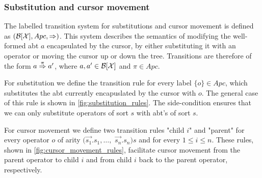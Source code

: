 \documentclass[sigplan,anonymous,review]{acmart}
\begin{document}
\subsubsection{Substitution and cursor movement}
The labelled transition system for substitutions and cursor movement is defined as $(\mathcal{B}[\mathcal{X} ], Apc, \Rightarrow)$. This system describes the semantics of modifying the well-formed abt $a$ encapsulated by the cursor, by either substituting it with an operator or moving the cursor up or down the tree. Transitions are therefore of the form $a \stackrel{\pi}{\Rightarrow} a'$, where $a, a' \in \mathcal{B}[\mathcal{X} ]$ and $\pi \in Apc$.

For substitution we define the transition rule for every label $\{o\} \in Apc$, which substitutes the abt currently encapuslated by the cursor with $o$. The general case of this rule is shown in \cref{fig:substitution_rules}. The side-condition ensures that we can only substitute operators of sort $s$ with abt's of sort $s$.

For cursor movement we define two transition rules "child  $i$" and "parent" for every operator $o$ of arity $(\Vec{s_1}.s_1, \dots,$ $ \Vec{s_n}.s_n)s$ and for every $1 \leq i \leq n$. These rules, shown in \cref{fig:cursor_movement_rules}, facilitate cursor movement from the parent operator to child $i$ and from child $i$ back to the parent operator, respectively.
\end{document}

